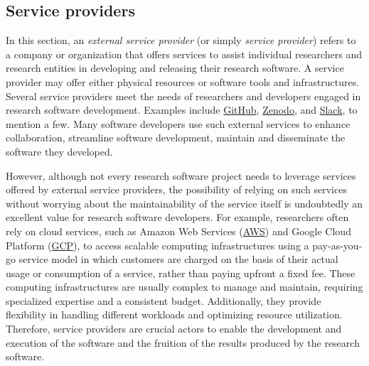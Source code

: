 \subsection{Service providers}


In this section, an \textit{external service provider} (or simply \textit{service provider}) refers to a company or organization that offers services to assist individual researchers and research entities in developing and releasing their research software. A service provider may offer either physical resources or software tools and infrastructures. Several service providers meet the needs of researchers and developers engaged in research software development. Examples include \href{https://github.com}{GitHub}, \href{https://zenodo.org/}{Zenodo}, and \href{https://slack.com}{Slack}, to mention a few. Many software developers use such external services to enhance collaboration, streamline software development, maintain and disseminate the software they developed. 

However, although not every research software project needs to leverage services offered by external service providers, the possibility of relying on such services without worrying about the maintainability of the service itself is undoubtedly an excellent value for research software developers. For example, researchers often rely on cloud services, such as Amazon Web Services (\href{https://aws.amazon.com/}{AWS}) and Google Cloud Platform (\href{https://cloud.google.com/}{GCP}), to access scalable computing infrastructures using a pay-as-you-go service model in which customers are charged on the basis of their actual usage or consumption of a service, rather than paying upfront a fixed fee. These computing infrastructures are usually complex to manage and maintain, requiring specialized expertise and a consistent budget. Additionally, they provide flexibility in handling different workloads and optimizing resource utilization. Therefore, service providers are crucial actors to enable the development and execution of the software and the fruition of the results produced by the research software.

